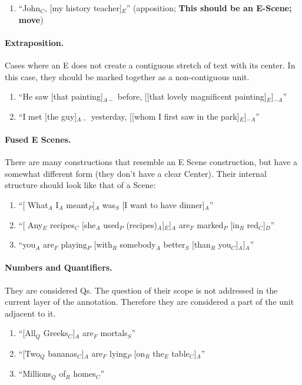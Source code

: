\documentclass[11pt]{article}
\newcommand{\be}{\begin{enumerate}}
\newcommand{\ee}{\end{enumerate}}
\begin{document}
\be
\item
	``John$_C$, [my history teacher]$_E$'' (apposition; {\bf This should be an E-Scene; move})
\ee


\paragraph{Extraposition.} Cases where an E does not create a contiguous stretch of text with its center. In this case, they should be marked together as a non-contiguous unit.
\be
\item
``He saw [that painting]$_{A-}$ before, [[that lovely magnificent painting]$_E$]$_{-A}$''
\item
``I met [the guy]$_{A-}$ yesterday, [[whom I first saw in the park]$_E$]$_{-A}$''
\ee

\paragraph{Fused E Scenes.} There are many constructions that resemble an E Scene construction, 
but have a somewhat different form (they don't have a clear Center). Their internal structure should look like that of a Scene:
\be \item
``[ What$_A$ I$_A$ meant$_P$]$_A$ was$_S$ [I want to have dinner]$_A$''
\item
``[ Any$_E$ recipes$_C$ [she$_A$ used$_P$ (recipes)$_A$]$_E$]$_A$ are$_F$ marked$_P$ [in$_R$ red$_C$]$_D$''
\item
``you$_A$ are$_F$ playing$_P$ [with$_R$ somebody$_A$ better$_S$ [than$_R$ you$_C$]$_A$]$_A$''
\ee

\paragraph{Numbers and Quantifiers.} They are considered Qs. The question of their scope is not addressed in the current layer of the annotation. Therefore they are considered a part of the unit adjacent to it.
\be
\item
``[All$_Q$ Greeks$_C$]$_A$ are$_F$ mortals$_S$''
\item
``[Two$_Q$ bananas$_C$]$_A$ are$_F$ lying$_P$ [on$_R$ the$_E$ table$_C$]$_A$''
\item
``Millions$_Q$ of$_R$ homes$_C$''
\ee
\end{document}
